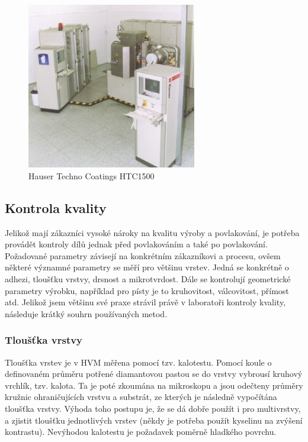 \documentclass[12pt]{article}
\begin{document}
\begin{figure}[htbp]
\centering
\includegraphics[width=280px]{htc625.jpg}
\caption{Hauser Techno Coatings HTC1500}
\label{htc625}
\end{figure}

\subsection{Kontrola kvality}
Jelikož mají zákazníci vysoké nároky na kvalitu výroby a povlakování, je potřeba provádět kontroly dílů jednak před povlakováním a také po povlakování. Požadované parametry závisejí na konkrétním zákazníkovi a procesu, ovšem některé významné parametry se měří pro většinu vrstev. Jedná se konkrétně o adhezi, tloušťku vrstvy, drsnost a mikrotvrdost. Dále se kontrolují geometrické parametry výrobku, například pro písty je to kruhovitost, válcovitost, přímost atd. Jelikož jsem většinu své praxe strávil právě v laboratoři kontroly kvality, následuje krátký souhrn používaných metod.


\subsubsection{Tloušťka vrstvy}
Tloušťka vrstev je v HVM měřena pomocí tzv. kalotestu. Pomocí koule o definovaném průměru potřené diamantovou pastou se do vrstvy vybrousí kruhový vrchlík, tzv. kalota. Ta je poté zkoumána na mikroskopu a jsou odečteny průměry kružnic ohraničujících vrstvu a substrát, ze kterých je následně vypočítána tloušťka vrstvy. Výhoda toho postupu je, že se dá dobře použít i pro multivrstvy, a zjistit tloušťku jednotlivých vrstev (někdy je potřeba použít kyselinu na zvýšení kontrastu). Nevýhodou kalotestu je požadavek poměrně hladkého povrchu. 
\end{document}
